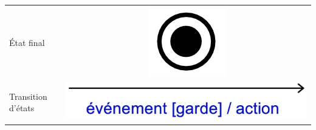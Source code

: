 \begin{table}[H]
\begin{adjustbox}{max width= \textwidth}
\begin{tabular}{l|c}
			\cmidrule(lr){1-2}
			\'Etat final & 
			\begin{minipage}[r]{0.3\textwidth}
				\centering
				\includegraphics[scale=0.2]{./Images/Diagrammes/diagram_activite_elements_activite_final.png}
			\end{minipage}\\
			\cmidrule(lr){1-2}
			Transition d'\'etats & 
			\begin{minipage}{0.5\textwidth}
				\includegraphics[width=\textwidth]{./Images/Diagrammes/diagram_statechart_transition.png}
				

\end{minipage}
\end{tabular}
\end{adjustbox}
\end{table}
